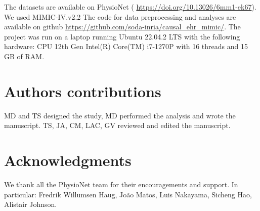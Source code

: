 \documentclass[10pt,letterpaper]{article}
\begin{document}
The datasets are available on PhysioNet (
\url{https://doi.org/10.13026/6mm1-ek67}). We used MIMIC-IV.v2.2 The code for
data preprocessing and analyses are available on github
\url{https://github.com/soda-inria/causal_ehr_mimic/}.
The project was run on a laptop running Ubuntu 22.04.2 LTS with the following hardware: CPU 12th Gen Intel(R) Core(TM) i7-1270P with 16 threads and 15 GB of RAM.


\section*{Authors contributions}

MD and TS designed the study, MD performed the analysis and wrote the manuscript.
TS, JA, CM, LAC, GV reviewed and edited the manuscript.

\section*{Acknowledgments}

We thank all the PhysioNet team for their encouragements and support. In
particular: Fredrik Willumsen Haug, João Matos, Luis Nakayama, Sicheng Hao, Alistair Johnson.

\nolinenumbers


\end{document}
